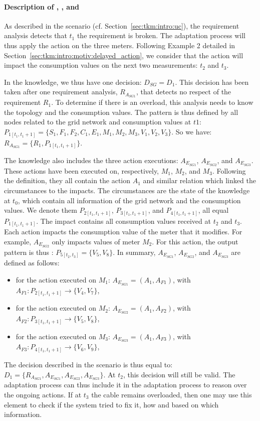 \paragraph{Description of , , and }
As described in the scenario (cf. Section~\ref{sec:tkm:intro:uc}), the requirement analysis detects that $t_1$ the requirement is broken.
The adaptation process will thus apply the  action on the three meters.
Following Example 2 detailed in Section~\ref{sec:tkm:intro:motiv:delayed_action}, we consider that the action will impact the consumption values on the next two measurements: $t_2$ and $t_3$. 

In the knowledge, we thus have one decision: $D_{SG} = {D_1}$.
This decision has been taken after one requirement analysis, $R_{A_{SG1}}$, that detects no respect of the requirement $R_1$.
To determine if there is an overload, this analysis needs to know the topology and the consumption values.
The pattern is thus defined by all nodes related to the grid network and consumption values at $t1$: $P_{1[t_1, t_1 + 1]} = \{S_1, F_1, F_2, C_1, E_1, M_1, M_2, M_3, V_1, V_2, V_3\}$.
So we have: $R_{A_{SG1}} = \{ R_1, P_{1[t_1, t_1 + 1]}\}$.

The knowledge also includes the three action executions: $A_{E_{SG1}}$, $A_{E_{SG2}}$, and $A_{E_{SG3}}$.
These actions have been executed on, respectively, $M_1$, $M_2$, and $M_3$.
Following the definition, they all contain the action $A_1$ and similar relation which linked the circumstances to the impacts.
The circumstances are the state of the knowledge at $t_0$, which contain all information of the grid network and the consumption values.
We denote them $P_{2[t_1, t_1 + 1]}$, $P_{3[t_1, t_1 + 1]}$, and $P_{4[t_1, t_1 + 1]}$, all equal $P_{1[t_1, t_1 + 1]}$.
The impact contains all consumption values received at $t_2$ and $t_3$.
Each action impacts the consumption value of the meter that it modifies.
For example, $A_{E_{SG2}}$ only impacts values of meter $M_2$.
For this action, the output pattern is thus : $P_{5[t_2, t_3]} = \{V_5, V_8\}$.
In summary, $A_{E_{SG1}}$, $A_{E_{SG2}}$, and $A_{E_{SG3}}$ are defined as follows: 
\begin{itemize}
    \item for the action executed on $M_1$: $A_{E_{SG1}} = (A_1, A_{F1})$, with $A_{F1}: P_{2[t_1, t_1 + 1]} \rightarrow \{V_4, V_7\}$,
    \item for the action executed on $M_2$: $A_{E_{SG2}} = (A_1, A_{F2})$, with $A_{F2}: P_{3[t_1, t_1 + 1]} \rightarrow \{V_5, V_8\}$,
    \item for the action executed on $M_3$: $A_{E_{SG3}} = (A_1, A_{F3})$, with $A_{F3}: P_{4[t_1, t_1 + 1]} \rightarrow \{V_6, V_9\}$,
\end{itemize}

The decision described in the scenario is thus equal to: $D_1 = \{ R_{A_{SG1}}, A_{E_{SG1}}, A_{E_{SG2}}, A_{E_{SG3}}\}$.
At $t_2$, this decision will still be valid.
The adaptation process can thus include it in the adaptation process to reason over the ongoing actions.
If at $t_3$ the cable remains overloaded, then one may use this element to check if the system tried to fix it, how and based on which information.